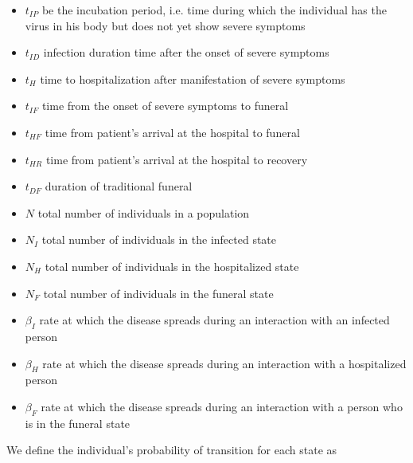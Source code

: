 \begin{itemize}
\item[]$t_{IP}$ be the incubation period, i.e. time during which the individual has the virus in his body but does not yet show severe symptoms
\item[] $t_{ID}$ infection duration time after the onset of severe symptoms
\item[] $t_{H}$ time to hospitalization after manifestation of severe symptoms
\item[] $t_{IF}$ time from the onset of severe symptoms to funeral
\item[] $t_{HF}$ time from patient's arrival at the hospital to funeral
\item[] $t_{HR}$ time from patient's arrival at the hospital to recovery
\item[] $t_{DF}$ duration of traditional funeral
\item[] $N$  total number of individuals in a population
\item[] $N_{I}$  total number of individuals in the infected state
\item[] $N_{H}$  total number of individuals in the hospitalized state
\item[] $N_{F}$  total number of individuals in the funeral state
\item[] $\beta_{I}$ rate at which the disease spreads during an interaction with an infected person
\item[] $\beta_{H}$ rate at which the disease spreads during an interaction with a hospitalized person
\item[] $\beta_{F}$ rate at which the disease spreads during an interaction with a person who is in the funeral state
\end{itemize}
We define the individual's probability of transition for each state as

\begin{subequations}
\begin{alignat}{1}

\end{alignat}
\end{subequations}
